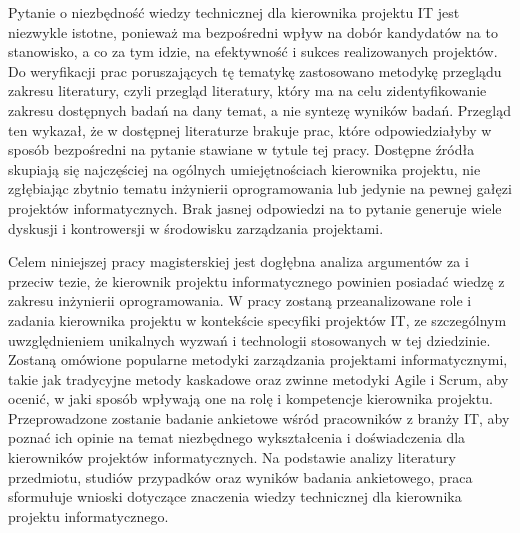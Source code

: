 Pytanie o niezbędność wiedzy technicznej dla kierownika projektu IT jest niezwykle istotne, ponieważ ma bezpośredni wpływ na dobór kandydatów na to stanowisko, a co za tym idzie, na efektywność i sukces realizowanych projektów. Do weryfikacji prac poruszających tę tematykę zastosowano metodykę przeglądu zakresu literatury, czyli przegląd literatury, który ma na celu zidentyfikowanie zakresu dostępnych badań na dany temat, a nie syntezę wyników badań. \autocite{metodyka} Przegląd ten wykazał, że w dostępnej literaturze brakuje prac, które odpowiedziałyby w sposób bezpośredni na pytanie stawiane w tytule tej pracy. Dostępne źródła skupiają się najczęściej na ogólnych umiejętnościach kierownika projektu, nie zgłębiając zbytnio tematu inżynierii oprogramowania lub jedynie na pewnej gałęzi projektów informatycznych. \autocite{data} Brak jasnej odpowiedzi na to pytanie generuje wiele dyskusji i kontrowersji w środowisku zarządzania projektami.

Celem niniejszej pracy magisterskiej jest dogłębna analiza argumentów za i przeciw tezie, że kierownik projektu informatycznego powinien posiadać wiedzę z zakresu inżynierii oprogramowania. W pracy zostaną przeanalizowane role i zadania kierownika projektu w kontekście specyfiki projektów IT, ze szczególnym uwzględnieniem unikalnych wyzwań i technologii stosowanych w tej dziedzinie. Zostaną omówione popularne metodyki zarządzania projektami informatycznymi, takie jak tradycyjne metody kaskadowe oraz zwinne metodyki Agile i Scrum, aby ocenić, w jaki sposób wpływają one na rolę i kompetencje kierownika projektu. Przeprowadzone zostanie badanie ankietowe wśród pracowników z branży IT, aby poznać ich opinie na temat niezbędnego wykształcenia i doświadczenia dla kierowników projektów informatycznych. Na podstawie analizy literatury przedmiotu, studiów przypadków oraz wyników badania ankietowego, praca sformułuje wnioski dotyczące znaczenia wiedzy technicznej dla kierownika projektu informatycznego.